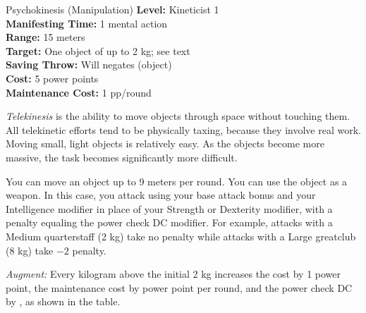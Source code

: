 {Psychokinesis (Manipulation)}
{
	\textbf{Level:}
	Kineticist 1\\
	\textbf{Manifesting Time:}
	1 mental action\\
	\textbf{Range:}
	15 meters\\
	\textbf{Target:}
	One object of up to 2 kg; see text\\
	\textbf{Saving Throw:}
	Will negates (object)\\
	\textbf{Cost:}
	5 power points\\
	\textbf{Maintenance Cost:}
	1 pp/round\\
}
{
	\emph{Telekinesis} is the ability to move objects through space without touching them.  All telekinetic efforts tend to be physically taxing, because they involve real work. Moving small, light objects is relatively easy. As the objects become more massive, the task becomes significantly more difficult.

	You can move an object up to 9 meters per round. You can use the object as a weapon. In this case, you attack using your base attack bonus and your Intelligence modifier in place of your Strength or Dexterity modifier, with a penalty equaling the power check DC modifier. For example, attacks with a Medium quarterstaff (2 kg) take no penalty while attacks with a Large greatclub (8 kg) take $-2$ penalty.

	\textit{Augment:} Every kilogram above the initial 2 kg increases the cost by 1 power point, the maintenance cost by \onehalf power point per round, and the power check DC by \onethird, as shown in the table. 

}
